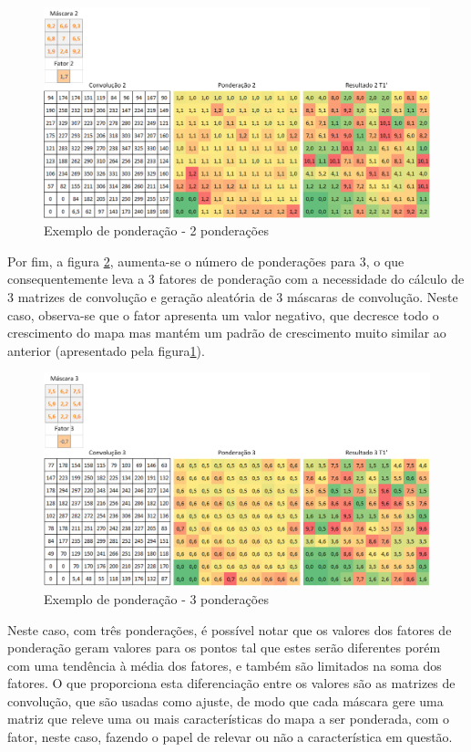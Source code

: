 \begin{figure}[h]
	\centering	\includegraphics[scale=0.6]{Figuras/PonderationsExample-2Ponderations.png}
	\caption{Exemplo de ponderação - 2 ponderações}
	\label{fig:TwoPondertion}
\end{figure}
 
	Por fim, a figura \ref{fig:TreePondertion}, aumenta-se o número de ponderações para 3, o que consequentemente leva a 3 fatores de ponderação com a necessidade do cálculo de 3 matrizes de convolução e geração aleatória de 3 máscaras de convolução. Neste caso, observa-se que o fator apresenta um valor negativo, que decresce todo o crescimento do mapa mas mantém um padrão de crescimento muito similar ao anterior (apresentado pela figura\ref{fig:TwoPondertion}). 
    
\begin{figure}[h]
	\centering	\includegraphics[scale=0.6]{Figuras/PonderationsExample-3Ponderations.png}
	\caption{Exemplo de ponderação - 3 ponderações}
	\label{fig:TreePondertion}
\end{figure}

Neste caso, com três ponderações, é possível notar que os valores dos fatores de ponderação geram valores para os pontos tal que estes serão diferentes porém com uma tendência à média dos fatores, e também são limitados na soma dos fatores. O que proporciona esta diferenciação entre os valores são as matrizes de convolução, que são usadas como ajuste, de modo que cada máscara gere uma matriz que releve uma ou mais características do mapa a ser ponderada, com o fator, neste caso, fazendo o papel de relevar ou não a característica em questão. 

